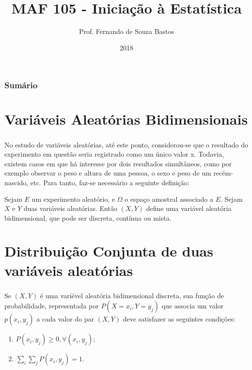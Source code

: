 \documentclass[14pt,aspectratio=1610]{beamer}
\title{MAF 105 - Iniciação à Estatística}
\author{Prof. Fernando de Souza Bastos}
\institute{Instituto de Ciências Exatas e Tecnológicas\texorpdfstring{\\ Universidade Federal de Viçosa}{}\texorpdfstring{\\ Campus UFV - Florestal}{}}
\date{2018}
\begin{document}


\frame{\titlepage}

\begin{frame}{}
\frametitle{\bf Sumário}
\tableofcontents
\end{frame}

\section{Variáveis Aleatórias Bidimensionais}
\begin{frame}{}
\frametitle{}
\begin{block}{}
\justifying
No estudo de variáveis aleatórias, até este ponto, considerou-se que o resultado do experimento em questão seria registrado como um único valor x. Todavia, existem casos em que há interesse por dois resultados simultâneos, como por exemplo observar o peso e altura de uma pessoa, o sexo e peso de um recém-nascido, etc. Para tanto, faz-se necessário a seguinte definição:

Sejam $E$ um experimento aleatório, e $\Omega$ o espaço amostral associado a $E$.
Sejam $X$ e $Y$ duas variáveis aleatórias. Então $(X, Y )$ define uma variável aleatória bidimensional, que pode ser discreta, contínua ou mista.
\end{block}
\end{frame}

\section{Distribuição Conjunta de duas variáveis aleatórias}
\begin{frame}{}
\frametitle{}
\begin{block}{}
\justifying
Se $(X, Y )$ é uma variével aleatória bidimensional discreta, sua função de
probabilidade, representada por $P(X = x_{i}, Y = y_{j})$ que associa um valor $p(x_{i}, y_{j})$ a cada
valor do par $(X, Y )$ deve satisfazer as seguintes condições:

\begin{enumerate}
\item $P(x_{i}, y_{j})\geq 0, \forall (x_{i}, y_{j});$
\item $\displaystyle \sum_{i} \sum_{j} P(x_{i}, y_{j}) = 1.$
\end{enumerate}
\end{block}
\end{frame}
\end{document}
